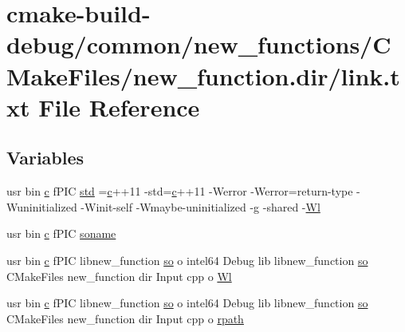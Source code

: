 \hypertarget{common_2new__functions_2CMakeFiles_2new__function_8dir_2link_8txt}{}\section{cmake-\/build-\/debug/common/new\+\_\+functions/\+C\+Make\+Files/new\+\_\+function.dir/link.txt File Reference}
\label{common_2new__functions_2CMakeFiles_2new__function_8dir_2link_8txt}
\subsection*{Variables}
\begin{DoxyCompactItemize}
\item 
usr bin \hyperlink{CMakeCache_8txt_aac1d6a1710812201527c735f7c6afbaa}{c} f\+P\+IC \hyperlink{common_2new__functions_2CMakeFiles_2new__function_8dir_2link_8txt_a5f87c8f8e33670f7c8c5221b6be1bcc4}{std} =\hyperlink{CMakeCache_8txt_aac1d6a1710812201527c735f7c6afbaa}{c}++11 -\/std=\hyperlink{CMakeCache_8txt_aac1d6a1710812201527c735f7c6afbaa}{c}++11 -\/Werror -\/Werror=return-\/type -\/Wuninitialized -\/Winit-\/self -\/Wmaybe-\/uninitialized -\/g -\/shared -\/\hyperlink{thirdparty_2extension_2CMakeFiles_2cpu__extension_8dir_2link_8txt_af9ccbf658ed2deb89d0d79f211e5b033}{Wl}
\item 
usr bin \hyperlink{CMakeCache_8txt_aac1d6a1710812201527c735f7c6afbaa}{c} f\+P\+IC \hyperlink{common_2new__functions_2CMakeFiles_2new__function_8dir_2link_8txt_ab65a9b6457c4853ed17f89f945516e66}{soname}
\item 
usr bin \hyperlink{CMakeCache_8txt_aac1d6a1710812201527c735f7c6afbaa}{c} f\+P\+IC libnew\+\_\+function \hyperlink{CMakeCache_8txt_aa98797039f48d335ee715de4cd92852f}{so} o intel64 Debug lib libnew\+\_\+function \hyperlink{CMakeCache_8txt_aa98797039f48d335ee715de4cd92852f}{so} C\+Make\+Files new\+\_\+function dir Input cpp o \hyperlink{common_2new__functions_2CMakeFiles_2new__function_8dir_2link_8txt_ae5e6c203d8e387cca9f4160d4baf5c0a}{Wl}
\item 
usr bin \hyperlink{CMakeCache_8txt_aac1d6a1710812201527c735f7c6afbaa}{c} f\+P\+IC libnew\+\_\+function \hyperlink{CMakeCache_8txt_aa98797039f48d335ee715de4cd92852f}{so} o intel64 Debug lib libnew\+\_\+function \hyperlink{CMakeCache_8txt_aa98797039f48d335ee715de4cd92852f}{so} C\+Make\+Files new\+\_\+function dir Input cpp o \hyperlink{common_2new__functions_2CMakeFiles_2new__function_8dir_2link_8txt_a1bfc9606f9190d816740775af4ffeb9f}{rpath}
\end{DoxyCompactItemize}


